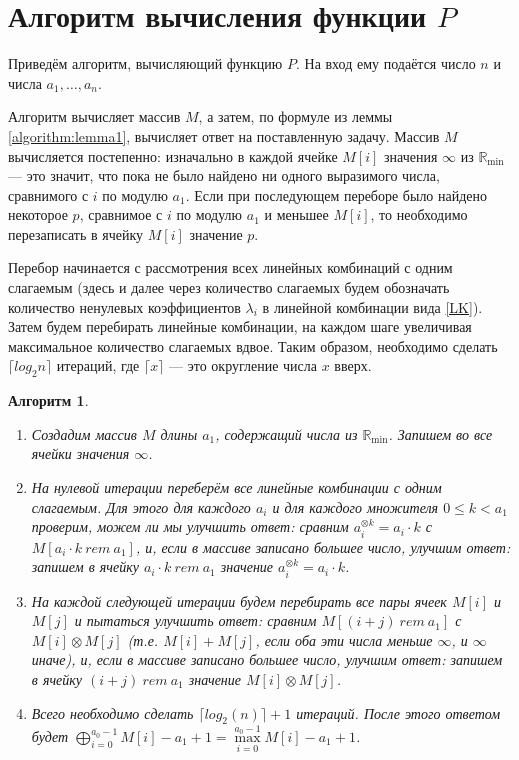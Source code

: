 \documentclass[12pt]{article}
\newtheorem{algorithm}[theorem]{Алгоритм}
\begin{document}
\section{Алгоритм вычисления функции $P$}
\label{algorithmSection}
Приведём алгоритм, вычисляющий функцию $P$. На вход ему подаётся  число $n$ и числа $a_1, \dots, a_n$.

Алгоритм вычисляет массив $M$, а затем, по формуле из леммы \ref{algorithm:lemma1}, вычисляет ответ на поставленную задачу. Массив $M$ вычисляется постепенно: изначально в каждой ячейке $M[i]$ значения $\infty$ из $\mathbb{R}_{\min}$ --- это значит, что пока не было найдено ни одного выразимого числа, сравнимого с $i$ по модулю $a_1$. Если при последующем переборе было найдено некоторое $p$, сравнимое с $i$ по модулю $a_1$ и меньшее $M[i]$, то необходимо перезаписать в ячейку $M[i]$ значение $p$.

Перебор начинается с рассмотрения всех линейных комбинаций с одним слагаемым (здесь и далее через количество слагаемых будем обозначать количество ненулевых коэффициентов $\lambda_i$ в линейной комбинации вида \ref{LK}). Затем будем перебирать линейные комбинации, на каждом шаге увеличивая максимальное количество слагаемых вдвое. Таким образом, необходимо сделать $\lceil log_2n \rceil$ итераций, где $\lceil x \rceil$ --- это округление числа $x$ вверх.

\begin{algorithm} { \ }
\label{algorithm}
\begin{enumerate}
	\item Создадим массив $M$ длины $a_1$, содержащий числа из $\mathbb{R}_{\min}$. Запишем во все ячейки значения $\infty$.
	
	\item На нулевой итерации переберём все линейные комбинации с одним слагаемым. Для этого для каждого $a_i$ и для каждого множителя $0 \le k < a_1$ проверим, можем ли мы улучшить ответ: сравним $a_i^{\otimes k} = a_i \cdot k$ с $M[a_i \cdot k \ rem \ a_1]$, и, если в массиве записано большее число, улучшим ответ: запишем в ячейку $a_i \cdot k \ rem \ a_1$ значение $a_i^{\otimes k} = a_i \cdot k$.
	
	\item На каждой следующей итерации будем перебирать все пары ячеек $M[i]$ и $M[j]$ и пытаться улучшить ответ: сравним $M[(i + j) \ rem \ a_1]$ с $M[i] \otimes M[j]$ (т.е. $M[i] + M[j]$, если оба эти числа меньше $\infty$, и $\infty$ иначе), и, если в массиве записано большее число, улучшим ответ: запишем в ячейку $(i + j) \ rem \ a_1$ значение $M[i] \otimes M[j]$.
	
	\item Всего необходимо сделать $\lceil log_2(n) \rceil + 1$ итераций. После этого ответом будет $\bigoplus \limits_{i = 0}^{a_0 - 1} M[i] - a_1 + 1 = \max\limits_{i = 0}^{a_0 - 1} M[i] - a_1 + 1$.
\end{enumerate}
\end{algorithm}
\end{document}
